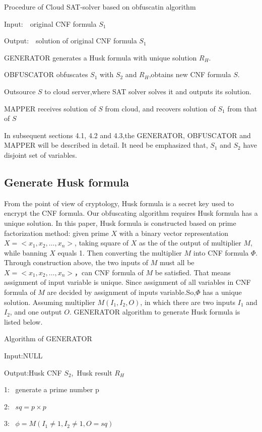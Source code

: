 \documentclass[runningheads,a4paper]{llncs}
\begin{document}
\noindent Procedure of Cloud SAT-solver based on obfuscatin algorithm

\noindent Input:~~original CNF formula $S_1$  

\noindent Output:~~solution of original CNF formula $S_1$ 

 GENERATOR generates a Husk formula with unique solution $R_H$.

 OBFUSCATOR obfuscates $S_1$  with $S_2$ and $R_H$,obtains new CNF formula $S$.

 Outsource $S$ to cloud server,where SAT solver solves it and outputs its solution. 

 MAPPER receives solution of $S$ from cloud, and recovers solution of $S_1$ from that of $S$ 

In subsequent sections 4.1, 4.2 and 4.3,the GENERATOR, OBFUSCATOR and MAPPER will be described in detail. 
It need be emphasized that, $S_1$  and $S_2$ have disjoint set of variables.
\subsection{Generate Husk formula}
From the point of view of cryptology, Husk formula is a secret key used to encrypt the CNF formula. 
Our obfuscating algorithm requires Husk formula has a unique solution.
In this paper, Husk formula is constructed based on prime factorization method:
given prime $X$ with a binary vector representation $X = <x_1,x_2,\dots,x_n>$, 
taking square of $X$ as the of the output of multiplier $M$, while banning $X$ equals 1.
Then converting the multiplier $M$ into CNF formula $\Phi$.
Through construction above, the two inputs of $M$ must all be $X = <x_1,x_2,\dots,x_n>$，can CNF formula of $M$ be satisfied.
That means assignment of input variable is unique.
Since assignment of all variables in CNF formula of $M$ are decided by assignment of inputs variable.So,$\Phi$ has a unique solution. 
Assuming multiplier $M (I_1, I_2, O)$, in which there are two inputs $I_1$ and $I_2$, and one output $O$.
GENERATOR algorithm to generate Husk formula is listed below.

\noindent Algorithm of GENERATOR

Input:NULL

Output:Husk CNF $S_2$,~Husk result $R_H$

1:~ generate a prime number p

2:~ $sq=p\times p$

3:~ $\phi= M(I_1 \neq 1, I_2\neq 1, O=sq)$
\end{document}

